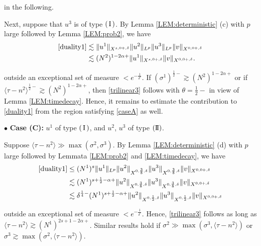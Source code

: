 \documentclass[11pt]{amsart}
\numberwithin{equation}{section} \numberwithin{theorem}{section}
\begin{document}
{
\noindent}
in the following.

Next, suppose that $u^3$ is of type $({\hspace{0.5mm}\text{I}\hspace{0.5mm}})$. 
By Lemma \ref{LEM:deterministic} (c) with $p$ large followed by
 Lemma \ref{LEM:prob2}, we have 
\begin{align*}
	\eqref{duality1} & \lesssim 
	\|u^1\|_{X^{s, 0+, {\delta}}} \|u^2\|_{L^p} \| u^3\|_{L^{p}}\|v\|_{X^{0, 0+, {\delta}}}\\
	& \lesssim (N^2)^{1-2{\alpha}+}\|u^1\|_{X^{s, 0+, {\delta}}}\|v\|_{X^{0, 0+, {\delta}}}. 
\end{align*}

{
\noindent} outside an exceptional set of measure $<e^{-\frac{1}{{\delta}^c}}$. If $({\sigma}^1)^{\frac{1}{2}-} \gtrsim (N^2)^{1-2{\alpha}+}$ or if ${\langle {\tau - n^2} \rangle}^{\frac{1}{2}-} \gtrsim (N^2)^{1-2{\alpha}+}$, then \eqref{trilinear3} follows with $\theta = \frac{1}{2}-$ in view of Lemma \ref{LEM:timedecay}. 
Hence, it remains to estimate the contribution to \eqref{duality1}
from the region satisfying \eqref{caseA} as well.

\medskip

{
\noindent} $\bullet$ {\bf Case (C):} $u^1$ of type $({\hspace{0.5mm}\text{I}\hspace{0.5mm}})$, and $u^2$, $u^3$ of type $({\text{I \hspace{-2.8mm} I} })$.

Suppose ${\langle {\tau - n^2} \rangle} \gg \max({\sigma}^2, {\sigma}^3)$. 
By Lemma \ref{LEM:deterministic} (d) with $p$ large followed by
 Lemmata \ref{LEM:prob2} and \ref{LEM:timedecay}, we have 
\begin{align*}
	\eqref{duality1} & \leq (N^1)^s \|u^1\|_{L^p}
	\|u^2\|_{X^{0, \frac{3}{8}, {\delta}}}\|u^3\|_{X^{0, \frac{3}{8}, {\delta}}}\|v\|_{X^{0, 0+, {\delta}}} \\
	 & \lesssim (N^1)^{s+\frac{1}{2}-{\alpha}+}\|u^2\|_{X^{0, \frac{3}{8}, {\delta}}}\|u^3\|_{X^{0, \frac{3}{8}, {\delta}}}\|v\|_{X^{0, 0+, {\delta}}} \\
	&\lesssim {\delta}^{\frac{1}{4}-} (N^1)^{s+\frac{1}{2}-{\alpha}+}\|u^2\|_{X^{0, \frac{1}{2}, {\delta}}} \|u^3\|_{X^{0, \frac{1}{2}, {\delta}}}\|v\|_{X^{0, 0+, {\delta}}} 
\end{align*}

{
\noindent} outside an exceptional set of measure $<e^{-\frac{1}{{\delta}^c}}$. Hence, \eqref{trilinear3} follows as long as ${\langle {\tau - n^2} \rangle} \gtrsim (N^1)^{2s + 1 - 2{\alpha}+}$. Similar results hold if ${\sigma}^2 \gg \max({\sigma}^3, {\langle {\tau-n^2} \rangle})$ 
or ${\sigma}^3 \gtrsim \max({\sigma}^2, {\langle {\tau-n^2} \rangle})$. 
\end{document}
